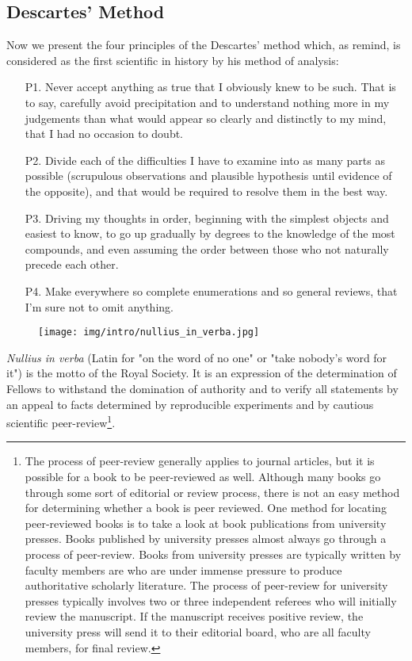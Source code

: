 	\subsection{Descartes' Method}
	Now we present the four principles of the Descartes' method which, as remind, is considered as the first scientific in history by his method of analysis:
	\begin{itemize}
		\item[P1.] Never accept anything as true that I obviously knew to be such. That is to say, carefully avoid precipitation and to understand nothing more in my judgements than what would appear so clearly and distinctly to my mind, that I had no occasion to doubt.
		
		\item[P2.] Divide each of the difficulties I have to examine into as many parts as possible (scrupulous observations and plausible hypothesis until evidence of the opposite), and that would be required to resolve them in the best way.
		
		\item[P3.] Driving my thoughts in order, beginning with the simplest objects and easiest to know, to go up gradually by degrees to the knowledge of the most compounds, and even assuming the order between those who not naturally precede each other.
		
		\item[P4.] Make everywhere so complete enumerations and so general reviews, that I'm sure not to omit anything.
	\end{itemize}
	\begin{figure}[H]
		\centering
		\texttt{[image: img/intro/nullius\_in\_verba.jpg]}
	\end{figure}
	\textit{Nullius in verba} (Latin for "on the word of no one" or "take nobody's word for it") is the motto of the Royal Society.  It is an expression of the determination of Fellows to withstand the domination of authority and to verify all statements by an appeal to facts determined by reproducible experiments and by cautious scientific peer-review\footnote{The process of peer-review generally applies to journal articles, but it is possible for a book to be peer-reviewed as well. Although many books go through some sort of editorial or review process, there is not an easy method for determining whether a book is peer reviewed. One method for locating peer-reviewed books is to take a look at book publications from university presses. Books published by university presses almost always go through a process of peer-review. Books from university presses are typically written by faculty members are who are under immense pressure to produce authoritative scholarly literature. The process of peer-review for university presses typically involves two or three independent referees who will initially review the manuscript. If the manuscript receives positive review, the university press will send it to their editorial board, who are all faculty members, for final review.}.

